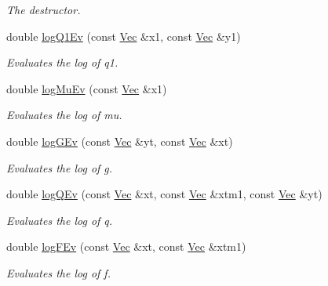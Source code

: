\begin{DoxyCompactItemize}
\begin{DoxyCompactList}\small\item\em The destructor. \end{DoxyCompactList}\item 
double \hyperlink{classSVolFilter_a9adc1eb288e46a2e05fa89d1b8d9f1ef}{log\+Q1\+Ev} (const \hyperlink{pmfs_8h_a4c7df05c6f5e8a0d15ae14bcdbc07152}{Vec} \&x1, const \hyperlink{pmfs_8h_a4c7df05c6f5e8a0d15ae14bcdbc07152}{Vec} \&y1)
\begin{DoxyCompactList}\small\item\em Evaluates the log of q1. \end{DoxyCompactList}\item 
double \hyperlink{classSVolFilter_ab052dcfa9ce2100ffb02350ccf0b6d17}{log\+Mu\+Ev} (const \hyperlink{pmfs_8h_a4c7df05c6f5e8a0d15ae14bcdbc07152}{Vec} \&x1)
\begin{DoxyCompactList}\small\item\em Evaluates the log of mu. \end{DoxyCompactList}\item 
double \hyperlink{classSVolFilter_a81a8e2857ddb699738461b5e2beab1c0}{log\+G\+Ev} (const \hyperlink{pmfs_8h_a4c7df05c6f5e8a0d15ae14bcdbc07152}{Vec} \&yt, const \hyperlink{pmfs_8h_a4c7df05c6f5e8a0d15ae14bcdbc07152}{Vec} \&xt)
\begin{DoxyCompactList}\small\item\em Evaluates the log of g. \end{DoxyCompactList}\item 
double \hyperlink{classSVolFilter_af2bbbe9c2d3bddb3e85b9ed5a14a24cb}{log\+Q\+Ev} (const \hyperlink{pmfs_8h_a4c7df05c6f5e8a0d15ae14bcdbc07152}{Vec} \&xt, const \hyperlink{pmfs_8h_a4c7df05c6f5e8a0d15ae14bcdbc07152}{Vec} \&xtm1, const \hyperlink{pmfs_8h_a4c7df05c6f5e8a0d15ae14bcdbc07152}{Vec} \&yt)
\begin{DoxyCompactList}\small\item\em Evaluates the log of q. \end{DoxyCompactList}\item 
double \hyperlink{classSVolFilter_a506d813662f0d888e48607962bfefbbd}{log\+F\+Ev} (const \hyperlink{pmfs_8h_a4c7df05c6f5e8a0d15ae14bcdbc07152}{Vec} \&xt, const \hyperlink{pmfs_8h_a4c7df05c6f5e8a0d15ae14bcdbc07152}{Vec} \&xtm1)
\begin{DoxyCompactList}\small\item\em Evaluates the log of f. \end{DoxyCompactList}\item 

\end{DoxyCompactItemize}

